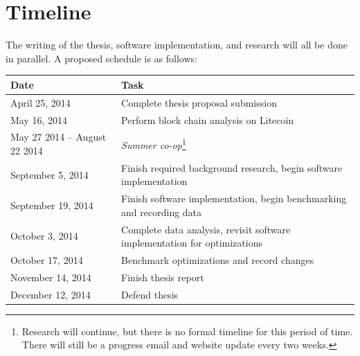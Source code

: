 \documentclass[11pt]{article}
\begin{document}
\section{Timeline}
The writing of the thesis, software implementation, and research will all be
done in parallel. A proposed schedule is as follows:
\begin{center}
\begin{tabularx}{\textwidth}{X|X}
    Date & Task\\
    \hline
    April 25, 2014 & Complete thesis proposal submission\\
    May 16, 2014 & Perform block chain analysis on Litecoin\\
    May 27 2014 -- August 22 2014 & \emph{Summer co-op}\footnote{Research will
                                    continue, but there is no formal timeline for
                                    this period of time. There will still be a
                                    progress email and website update every two
                                    weeks.}\\
    September 5, 2014 & Finish required background research, begin software
                        implementation\\
    September 19, 2014 & Finish software implementation, begin benchmarking and
                         recording data\\
    October 3, 2014 & Complete data analysis, revisit software implementation
                      for optimizations\\
    October 17, 2014 & Benchmark optimizations and record changes\\
    November 14, 2014 & Finish thesis report\\
    December 12, 2014 & Defend thesis\\
\end{tabularx}
\end{center}


\end{document}

